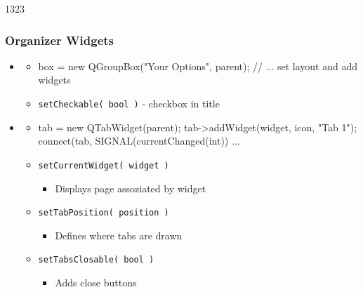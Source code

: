 \begin{slide}[fragile]{1323}
  \frametitle{Organizer Widgets}
  \begin{itemize}
  \item \textbf{}
    \begin{itemize}
    \item[]
      \begin{cpp}
box = new QGroupBox("Your Options", parent);
// ... set layout and add widgets
     \end{cpp}
   \item \texttt{setCheckable( bool )} - checkbox in title
    \end{itemize}

  \item \textbf{}
    \begin{itemize}
    \item[]
      \begin{cpp}
tab = new QTabWidget(parent);
tab->addWidget(widget, icon, "Tab 1");
connect(tab, SIGNAL(currentChanged(int)) ...
      \end{cpp}
    \item \texttt{setCurrentWidget( widget )}
      \begin{itemize}
      \item Displays page assoziated by widget
      \end{itemize}
    \item \texttt{setTabPosition( position )}
      \begin{itemize}
      \item Defines where tabs are drawn
      \end{itemize}
    \item \texttt{setTabsClosable( bool )}
      \begin{itemize}
      \item Adds close buttons
      \end{itemize}

    \end{itemize}

  \end{itemize}
\end{slide}

